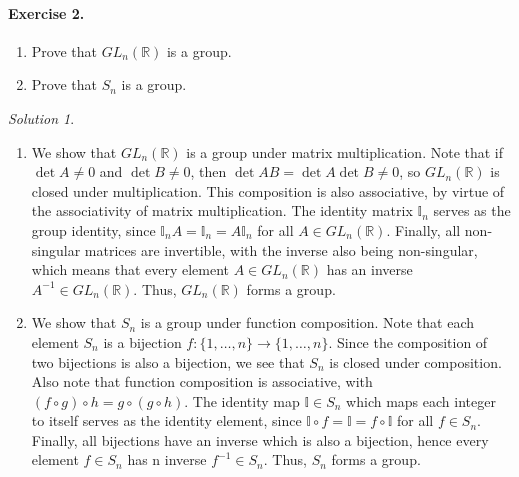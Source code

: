 \documentclass[11pt]{report}
\def\R{\mathbb{R}}
\theoremstyle{remark}
\newtheorem*{solution}{Solution}
\begin{document}
    \paragraph{Exercise 2.} \mbox{}
    \begin{enumerate}
        \itemsep0em
        \item Prove that $GL_n(\R)$ is a group.
        \item Prove that $S_n$ is a group.
    \end{enumerate}
    \begin{solution} \mbox{}
        \begin{enumerate}
            \item We show that $GL_n(\R)$ is a group under matrix multiplication.
            Note that if $\det{A} \neq 0$ and $\det{B} \neq 0$, then $\det{AB} =
            \det{A}\det{B} \neq 0$, so $GL_n(\R)$ is closed under multiplication.
            This composition is also associative, by virtue of the associativity of
            matrix multiplication. The identity matrix $\mathbb{I}_n$ serves as the
            group identity, since $\mathbb{I}_nA = \mathbb{I}_n = A\mathbb{I}_n$ for
            all $A \in GL_n(\R)$. Finally, all non-singular matrices are invertible,
            with the inverse also being non-singular, which means that every element
            $A \in GL_n(\R)$ has an inverse $A^{-1} \in GL_n(\R)$. Thus, $GL_n(\R)$
            forms a group.

            \item We show that $S_n$ is a group under function composition. Note
            that each element $S_n$ is a bijection $f\colon \{1, \dots, n\} \to \{1,
            \dots, n\}$. Since the composition of two bijections is also a
            bijection, we see that $S_n$ is closed under composition. Also note that
            function composition is associative, with $(f\circ g) \circ h = g \circ
            (g \circ h)$. The identity map $\mathbb{I} \in S_n$ which maps each
            integer to itself serves as the identity element, since $\mathbb{I} \circ f
            = \mathbb{I} = f \circ \mathbb{I}$ for all $f \in S_n$. Finally, all
            bijections have an inverse which is also a bijection, hence every
            element $f \in S_n$ has n inverse $f^{-1} \in S_n$. Thus, $S_n$ forms a
            group.
        \end{enumerate}
    \end{solution}
\end{document}
